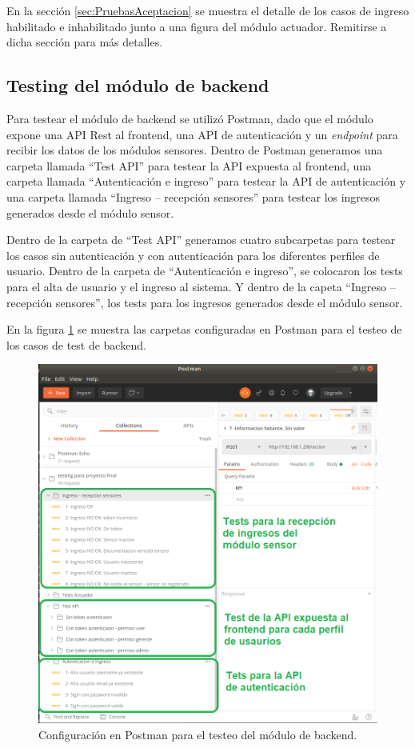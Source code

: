 En la sección \ref{sec:PruebasAceptacion} se muestra el detalle de los casos de ingreso habilitado e inhabilitado junto a una figura del módulo actuador. Remitirse a dicha sección para más detalles.

\pagebreak
\subsection{Testing del módulo de backend}

Para testear el módulo de backend se utilizó Postman, dado que el módulo expone una API Rest al frontend, una API de autenticación y un \textit{endpoint} \citep{WEBSITE:Endpoints} para recibir los datos de los módulos sensores. Dentro de Postman generamos una carpeta llamada ``Test API'' para testear la API expuesta al frontend, una carpeta llamada ``Autenticación e ingreso'' para testear la API de autenticación y una carpeta llamada ``Ingreso – recepción sensores'' para testear los ingresos generados desde el módulo sensor.

Dentro de la carpeta de ``Test API'' generamos cuatro subcarpetas para testear los casos sin autenticación y con autenticación para los diferentes perfiles de usuario. Dentro de la carpeta de ``Autenticación e ingreso'', se colocaron los tests para el alta de usuario y el ingreso al sistema. Y dentro de la capeta ``Ingreso – recepción sensores'', los tests para los ingresos generados desde el módulo sensor.

En la figura \ref{fig:testsBackend} se muestra las carpetas configuradas en Postman para el testeo de los casos de test de backend.

\begin{figure}[h]
	\centering
	\includegraphics[width=1\textwidth]{./Figures/testsBackend.png}
	\caption{Configuración en Postman para el testeo del módulo de backend.}
	\label{fig:testsBackend}
\end{figure}


